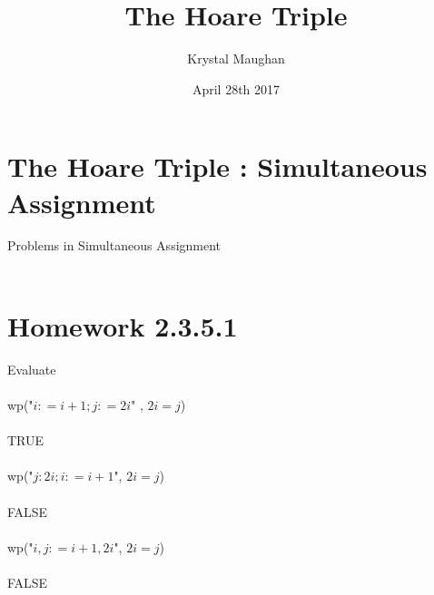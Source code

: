 \documentclass{article}
\title{The Hoare Triple}
\author{Krystal Maughan }
\date{April 28th 2017}
\begin{document}
\maketitle

\section{The Hoare Triple : Simultaneous Assignment}
Problems in Simultaneous Assignment
\\
\\
\section{Homework 2.3.5.1}
Evaluate
\\
\\
wp("$i : = i + 1; j : = 2i$" , $2i = j$)
\\
\\
TRUE
\\
\\
wp("$j : 2i; i : = i + 1$", $2i = j$)
\\
\\
FALSE
\\
\\
wp("$i, j : = i + 1, 2i$", $2i = j$)
\\
\\
FALSE
\\
\\
\\
\\
\\
\\
\\
\\
\\
\end{document}
